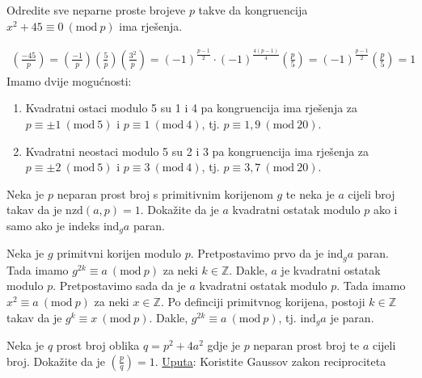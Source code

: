 \documentclass{exam}
\newcommand{\Mod}[1]{\ (\mathrm{mod}\ #1)}
\begin{document}
\begin{questions}
\begin{solution}
\begin{parts}
  \end{parts}
\end{solution}

\pagebreak

\question Odredite sve neparne proste brojeve $p$ takve da kongruencija $x^2 + 45 \equiv 0 \Mod{p}$ ima rješenja.

\begin{solution}
  \begin{align*}
    \left( \frac{-45}{p} \right) = \left( \frac{-1}{p} \right) \left( \frac{5}{p} \right) \left( \frac{3^2}{p} \right) = (-1)^{\frac{p-1}{2}} \cdot (-1)^{\frac{4(p-1)}{4}} \left( \frac{p}{5} \right) = (-1)^{\frac{p-1}{2}} \left( \frac{p}{5} \right) = 1
  \end{align*}
  Imamo dvije mogućnosti:
  \begin{enumerate}
    \item Kvadratni ostaci modulo 5 su 1 i 4 pa kongruencija ima rješenja za $p \equiv \pm 1 \Mod{5}$ i $p \equiv 1 \Mod{4}$, tj. $p \equiv 1, 9 \Mod{20}$.
    \item Kvadratni neostaci modulo 5 su 2 i 3 pa kongruencija ima rješenja za $p \equiv \pm 2 \Mod{5}$ i $p \equiv 3 \Mod{4}$, tj. $p \equiv 3, 7 \Mod{20}$.
  \end{enumerate}
\end{solution}

\question Neka je $p$ neparan prost broj s primitivnim korijenom $g$ te neka je $a$ cijeli broj takav da je $\text{nzd}(a, p) = 1$. Dokažite da je $a$ kvadratni ostatak modulo $p$ ako i samo ako je indeks $\text{ind}_g a$ paran.

\begin{solution}
  Neka je $g$ primitvni korijen modulo $p$. Pretpostavimo prvo da je $\text{ind}_g a$ paran. Tada imamo $g^{2k} \equiv a \Mod{p}$ za neki $k \in \mathbb{Z}$. Dakle, $a$ je kvadratni ostatak modulo $p$. Pretpostavimo sada da je $a$ kvadratni ostatak modulo $p$. Tada imamo $x^2 \equiv a \Mod{p}$ za neki $x \in \mathbb{Z}$. Po definciji primitvnog korijena, postoji $k \in \mathbb{Z}$ takav da je $g^k \equiv x \Mod{p}$. Dakle, $g^{2k} \equiv a \Mod{p}$, tj. $\text{ind}_g a$ je paran.
\end{solution}

\question Neka je $q$ prost broj oblika $q = p^2 + 4a^2$ gdje je $p$ neparan prost broj te $a$ cijeli broj. Dokažite da je
$\displaystyle \left( \frac{p}{q} \right) = 1$. \newline
\underline{Uputa}: Koristite Gaussov zakon reciprociteta


\end{questions}
\end{document}
